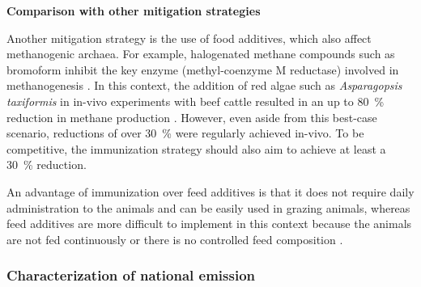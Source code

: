 \textbf{Comparison with other mitigation strategies}

\noindent Another mitigation strategy is the use of food additives, which also affect methanogenic archaea. For example, halogenated methane compounds such as bromoform inhibit the key enzyme (methyl-coenzyme M reductase) involved in methanogenesis \parencite {boadiMitigationStrategiesReduce2004, malyuginaMitigationStrategiesMethane2025, garnettGreenhousegasAbatementAustralian2024}. In this context, the addition of red algae such as \textit{Asparagopsis taxiformis} in in-vivo experiments with beef cattle resulted in an up to 80~\% reduction in methane production \parencite[Table 4]{malyuginaMitigationStrategiesMethane2025}. However, even aside from this best-case scenario, reductions of over 30~\% were regularly achieved in-vivo. To be competitive, the immunization strategy should also aim to achieve at least a 30~\% reduction.

An advantage of immunization over feed additives is that it does not require daily administration to the animals and can be easily used in grazing animals, whereas feed additives are more difficult to implement in this context because the animals are not fed continuously or there is no controlled feed composition \parencite {malyuginaMitigationStrategiesMethane2025, baca-gonzalezAreVaccinesSolution2020}.


\subsubsection{Characterization of national emission}
\label{sec:diskus_character_methan_emis}

